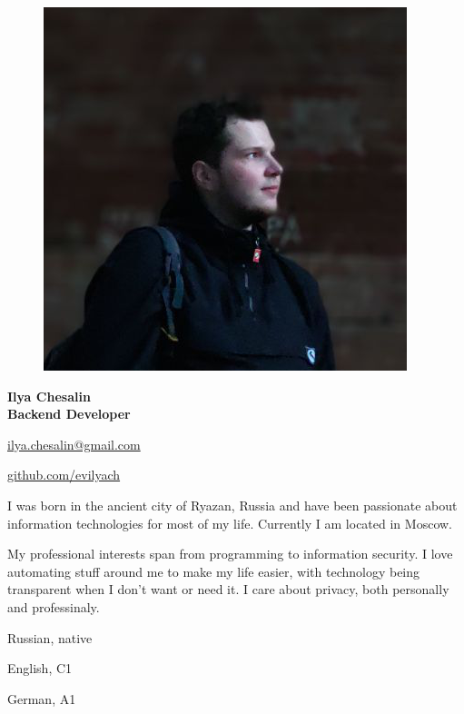 \begin{figure}
	\hfill
	\includegraphics[width=0.6\columnwidth]{photo}
	\vspace{-7cm}
\end{figure}

\begin{flushright}\small

\end{flushright}\normalsize
\framebreak


\Huge\bfseries {{\color{Cyan} Ilya} {\color{Black} Chesalin}} \\
\Large\bfseries Backend Developer \\

\normalsize\normalfont


 \url{ilya.chesalin@gmail.com}

 \url{github.com/evilyach}

\SmallSep

I was born in the ancient city of Ryazan, Russia and have been passionate about
information technologies for most of my life. Currently I am located in Moscow.

My professional interests span from programming to information security. I love
automating stuff around me to make my life easier, with technology being transparent
when I don't want or need it. I care about privacy, both personally and professinaly.


\Sep


\begin{multicols}{3}
\begin{compactitem}[\color{Cyan}$\circ$]
    \item Russian, native
    \item English, C1
    \item German, A1
\end{compactitem}
\end{multicols}

